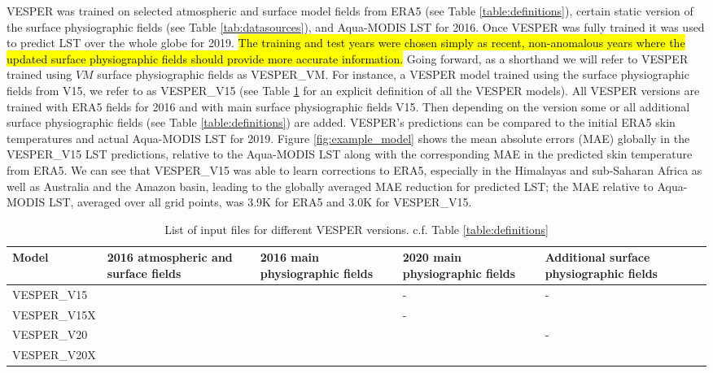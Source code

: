 \documentclass[hess, twostagejnl]{copernicus}
\begin{document}
 \noindent VESPER was trained on selected atmospheric and surface model fields from ERA5 (see Table \ref{table:definitions}), certain static version of the surface physiographic fields (see Table \ref{tab:datasources}), and Aqua-MODIS LST for 2016. Once VESPER was fully trained it was used to predict LST over the whole globe for 2019. \hl{The training and test years were chosen simply as recent, non-anomalous years where the updated  surface physiographic fields should provide more accurate information.} Going forward, as a shorthand we will refer to VESPER trained using $VM$ surface physiographic fields as VESPER\_VM. For instance, a VESPER model trained using the surface physiographic fields from V15, we refer to as VESPER\_V15 (see Table \ref{tab:vesper_table} for an explicit definition of all the VESPER models). All VESPER versions are trained with ERA5 fields for 2016 and with main surface physiographic fields V15. Then depending on the version some or all additional surface physiographic fields (see Table \ref{table:definitions}) are added. VESPER’s predictions can be compared to the initial ERA5 skin temperatures and actual Aqua-MODIS LST for 2019. Figure \ref{fig:example_model} shows the mean absolute errors (MAE) globally in the VESPER\_V15 LST predictions, relative to the Aqua-MODIS LST along with the corresponding MAE in the predicted skin temperature from ERA5. We can see that VESPER\_V15 was able to learn corrections to ERA5, especially in the Himalayas and sub-Saharan Africa as well as Australia and the Amazon basin, leading to the globally averaged MAE reduction for predicted LST; the MAE relative to  Aqua-MODIS LST, averaged over all grid points, was 3.9K for ERA5 and 3.0K for VESPER\_V15. \newline 
 
 

 
  
 
 \begin{table}
 	\begin{tabularx}{\textwidth}{lXXXX}
 		\toprule
 		Model & 2016 atmospheric and surface fields & 2016 main physiographic fields & 2020 main physiographic fields & Additional surface physiographic fields \\
 		\hline
 		VESPER\_V15 & \checkmark & \checkmark & - & - \\
 		VESPER\_V15X & \checkmark & \checkmark & - & \checkmark \\
 		VESPER\_V20 & \checkmark & \checkmark & \checkmark & - \\
 		VESPER\_V20X & \checkmark & \checkmark & \checkmark & \checkmark \\
 		
 		\bottomrule
 	\end{tabularx}
 	\caption{List of input files for different VESPER versions. c.f. Table \ref{table:definitions}}
 	\label{tab:vesper_table}
 \end{table}
 
\end{document}
